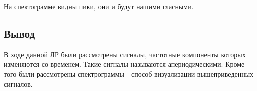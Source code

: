 На спектограмме видны пики, они и будут нашими гласными.

\subsection{Вывод}

В ходе данной ЛР были рассмотрены сигналы, частотные компоненты которых изменяются со временем. Такие сигналы называются апериодическими. Кроме того были рассмотрены спектрограммы - способ визуализации вышеприведенных сигналов.